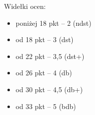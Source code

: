 \documentclass[12pt,a4paper]{report}
\begin{document}
Widełki ocen:

\begin{itemize}

\item poniżej 18 pkt -- 2 (ndst)

\item od 18 pkt -- 3 (dst)

\item od 22 pkt -- 3,5 (dst+)

\item od 26 pkt -- 4 (db)

\item od 30 pkt -- 4,5 (db+)

\item od 33 pkt -- 5 (bdb)

\end{itemize}
\end{document}
